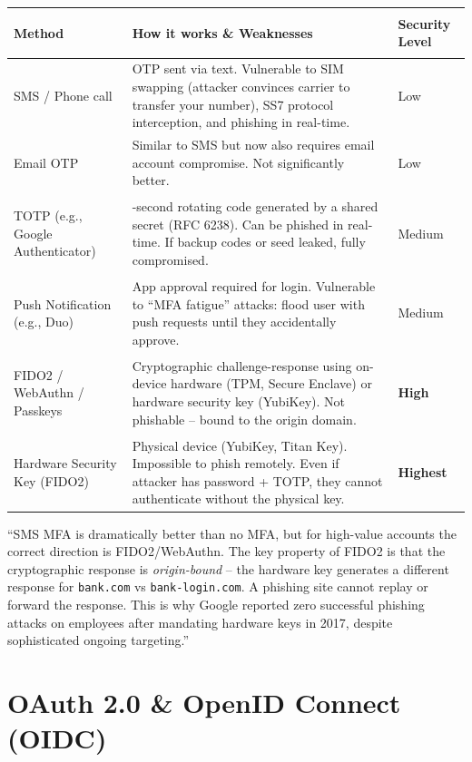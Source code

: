 \documentclass[11pt, letterpaper]{article}
\newcommand{\talkingpoint}[1]{%
  \begin{tcolorbox}[colback=talkbg, colframe=talkborder,
    title={\bfseries Interview Talking Point}, arc=3pt, boxrule=1pt]
  #1
  \end{tcolorbox}%
}
\begin{document}
\noindent
{\renewcommand{\arraystretch}{1.6}
\begin{tabularx}{\textwidth}{>{\bfseries\raggedright\arraybackslash}p{3.5cm}
                              >{\raggedright\arraybackslash}X
                              >{\centering\arraybackslash}p{2cm}}
\toprule
\rowcolor{tableheader}
\textbf{Method} & \textbf{How it works \& Weaknesses} & \textbf{Security Level} \\
\midrule
\rowcolor{rowB}  SMS / Phone call & OTP sent via text. Vulnerable to SIM swapping (attacker convinces carrier to transfer your number), SS7 protocol interception, and phishing in real-time. & Low \\
\rowcolor{rowA}  Email OTP & Similar to SMS but now also requires email account compromise. Not significantly better. & Low \\
\rowcolor{rowB}  TOTP (e.g., Google Authenticator) & 30-second rotating code generated by a shared secret (RFC 6238). Can be phished in real-time. If backup codes or seed leaked, fully compromised. & Medium \\
\rowcolor{rowA}  Push Notification (e.g., Duo) & App approval required for login. Vulnerable to ``MFA fatigue'' attacks: flood user with push requests until they accidentally approve. & Medium \\
\rowcolor{rowB}  FIDO2 / WebAuthn / Passkeys & Cryptographic challenge-response using on-device hardware (TPM, Secure Enclave) or hardware security key (YubiKey). Not phishable -- bound to the origin domain. & \textbf{High} \\
\rowcolor{rowA}  Hardware Security Key (FIDO2) & Physical device (YubiKey, Titan Key). Impossible to phish remotely. Even if attacker has password + TOTP, they cannot authenticate without the physical key. & \textbf{Highest} \\
\bottomrule
\end{tabularx}}

\talkingpoint{``SMS MFA is dramatically better than no MFA, but for high-value accounts the correct direction is FIDO2/WebAuthn. The key property of FIDO2 is that the cryptographic response is \emph{origin-bound} -- the hardware key generates a different response for \texttt{bank.com} vs \texttt{bank-login.com}. A phishing site cannot replay or forward the response. This is why Google reported zero successful phishing attacks on employees after mandating hardware keys in 2017, despite sophisticated ongoing targeting.''}

\section*{OAuth 2.0 \& OpenID Connect (OIDC)}
\end{document}

